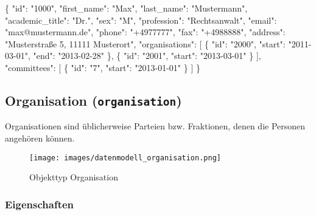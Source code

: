 \documentclass[,a4paper]{article}
\makeatletter
\newenvironment{Shaded}{}{}
\newcommand{\DataTypeTok}[1]{\textcolor[rgb]{0.56,0.13,0.00}{{#1}}}
\newcommand{\StringTok}[1]{\textcolor[rgb]{0.25,0.44,0.63}{{#1}}}
\newcommand{\NormalTok}[1]{{#1}}
\def\maxwidth{\ifdim\Gin@nat@width>\linewidth\linewidth
\else\Gin@nat@width\fi}
\let\Oldincludegraphics\includegraphics
\renewcommand{\includegraphics}[1]{\Oldincludegraphics[width=\maxwidth]{#1}}
\makeatother
\begin{document}
\begin{Shaded}
\begin{Highlighting}[]
\NormalTok{\{}
    \DataTypeTok{"id"}\NormalTok{: }\StringTok{"1000"}\NormalTok{,}
    \DataTypeTok{"first_name"}\NormalTok{: }\StringTok{"Max"}\NormalTok{,}
    \DataTypeTok{"last_name"}\NormalTok{: }\StringTok{"Mustermann"}\NormalTok{,}
    \DataTypeTok{"academic_title"}\NormalTok{: }\StringTok{"Dr."}\NormalTok{,}
    \DataTypeTok{"sex"}\NormalTok{: }\StringTok{"M"}\NormalTok{,}
    \DataTypeTok{"profession"}\NormalTok{: }\StringTok{"Rechtsanwalt"}\NormalTok{,}
    \DataTypeTok{"email"}\NormalTok{: }\StringTok{"max@mustermann.de"}\NormalTok{,}
    \DataTypeTok{"phone"}\NormalTok{: }\StringTok{"+4977777"}\NormalTok{,}
    \DataTypeTok{"fax"}\NormalTok{: }\StringTok{"+4988888"}\NormalTok{,}
    \DataTypeTok{"address"}\NormalTok{: }\StringTok{"Musterstraße 5, 11111 Musterort"}\NormalTok{,}
    \DataTypeTok{"organisations"}\NormalTok{: [}
        \NormalTok{\{}
            \DataTypeTok{"id"}\NormalTok{: }\StringTok{"2000"}\NormalTok{,}
            \DataTypeTok{"start"}\NormalTok{: }\StringTok{"2011-03-01"}\NormalTok{,}
            \DataTypeTok{"end"}\NormalTok{: }\StringTok{"2013-02-28"}
        \NormalTok{\},}
        \NormalTok{\{}
            \DataTypeTok{"id"}\NormalTok{: }\StringTok{"2001"}\NormalTok{,}
            \DataTypeTok{"start"}\NormalTok{: }\StringTok{"2013-03-01"}
        \NormalTok{\}}
    \NormalTok{],}
    \DataTypeTok{"committees"}\NormalTok{: [}
        \NormalTok{\{}
            \DataTypeTok{"id"}\NormalTok{: }\StringTok{"7"}\NormalTok{,}
            \DataTypeTok{"start"}\NormalTok{: }\StringTok{"2013-01-01"}
        \NormalTok{\}}
    \NormalTok{]}
\NormalTok{\}}
\end{Highlighting}
\end{Shaded}

\subsection{Organisation (\texttt{organisation})}

Organisationen sind üblicherweise Parteien bzw. Fraktionen, denen die
Personen angehören können.

\begin{figure}[htbp]
\centering
\texttt{[image: images/datenmodell\_organisation.png]}
\caption{Objekttyp Organisation}
\end{figure}

\subsubsection{Eigenschaften}
\end{document}
